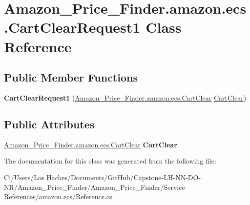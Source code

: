 \hypertarget{class_amazon___price___finder_1_1amazon_1_1ecs_1_1_cart_clear_request1}{\section{Amazon\-\_\-\-Price\-\_\-\-Finder.\-amazon.\-ecs.\-Cart\-Clear\-Request1 Class Reference}
\label{class_amazon___price___finder_1_1amazon_1_1ecs_1_1_cart_clear_request1}
}
\subsection*{Public Member Functions}
\begin{DoxyCompactItemize}
\item 
\hypertarget{class_amazon___price___finder_1_1amazon_1_1ecs_1_1_cart_clear_request1_ab3dd78da03d1c8d2d58a6dfecbe55031}{{\bfseries Cart\-Clear\-Request1} (\hyperlink{class_amazon___price___finder_1_1amazon_1_1ecs_1_1_cart_clear}{Amazon\-\_\-\-Price\-\_\-\-Finder.\-amazon.\-ecs.\-Cart\-Clear} \hyperlink{class_amazon___price___finder_1_1amazon_1_1ecs_1_1_cart_clear}{Cart\-Clear})}\label{class_amazon___price___finder_1_1amazon_1_1ecs_1_1_cart_clear_request1_ab3dd78da03d1c8d2d58a6dfecbe55031}

\end{DoxyCompactItemize}
\subsection*{Public Attributes}
\begin{DoxyCompactItemize}
\item 
\hypertarget{class_amazon___price___finder_1_1amazon_1_1ecs_1_1_cart_clear_request1_a5d16d188c3deff27a1612a9c8414af8a}{\hyperlink{class_amazon___price___finder_1_1amazon_1_1ecs_1_1_cart_clear}{Amazon\-\_\-\-Price\-\_\-\-Finder.\-amazon.\-ecs.\-Cart\-Clear} {\bfseries Cart\-Clear}}\label{class_amazon___price___finder_1_1amazon_1_1ecs_1_1_cart_clear_request1_a5d16d188c3deff27a1612a9c8414af8a}

\end{DoxyCompactItemize}


The documentation for this class was generated from the following file\-:\begin{DoxyCompactItemize}
\item 
C\-:/\-Users/\-Los Haches/\-Documents/\-Git\-Hub/\-Capstone-\/\-L\-H-\/\-N\-N-\/\-D\-O-\/\-N\-R/\-Amazon\-\_\-\-Price\-\_\-\-Finder/\-Amazon\-\_\-\-Price\-\_\-\-Finder/\-Service References/amazon.\-ecs/Reference.\-cs\end{DoxyCompactItemize}

